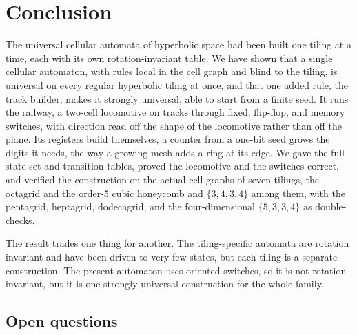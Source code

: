 \section{Conclusion}
\label{sec:conclusion}

The universal cellular automata of hyperbolic space had been built one tiling at a time, each with its own
rotation-invariant table. We have shown that a single cellular automaton, with rules local in the cell graph
and blind to the tiling, is universal on every regular hyperbolic tiling at once, and that one added rule, the
track builder, makes it strongly universal, able to start from a finite seed. It runs the railway, a two-cell
locomotive on tracks through fixed, flip-flop, and memory switches, with direction read off the shape of the
locomotive rather than off the plane. Its registers build themselves, a counter from a one-bit seed grows the
digits it needs, the way a growing mesh adds a ring at its edge. We gave the full state set and transition
tables, proved the locomotive and the switches correct, and verified the construction on the actual cell graphs
of seven tilings, the octagrid and the order-5 cubic honeycomb and $\{3,4,3,4\}$ among them, with the
pentagrid, heptagrid, dodecagrid, and the four-dimensional $\{5,3,3,4\}$ as double-checks.

The result trades one thing for another. The tiling-specific automata are rotation invariant and have been
driven to very few states, but each tiling is a separate construction. The present automaton uses oriented
switches, so it is not rotation invariant, but it is one strongly universal construction for the whole family.

\subsection{Open questions}

